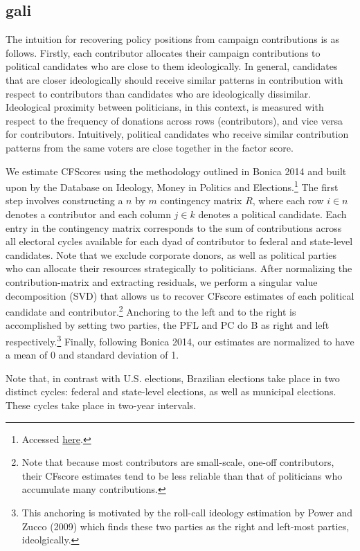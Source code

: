 \documentclass[12pt,english]{article}
\numberwithin{equation}{section}
\theoremstyle{plain}
\theoremstyle{remark}
\theoremstyle{plain}
\begin{document}
 
\subsection{gali}
The intuition for recovering policy positions from campaign contributions is as follows. Firstly, each contributor allocates their campaign contributions to political candidates who are close to them ideologically. In general, candidates that are closer ideologically should receive similar patterns in contribution with respect to contributors than candidates who are ideologically dissimilar. Ideological proximity between politicians, in this context, is measured with respect to the frequency of donations across rows (contributors), and vice versa for contributors. Intuitively, political candidates who receive similar contribution patterns from the same voters are close together in the factor score.

We estimate CFScores using the methodology outlined in Bonica 2014 and built upon by the Database on Ideology, Money in Politics and Elections.\footnote{Accessed \href{https://web.stanford.edu/~bonica/data.html}{here}.} The first step involves constructing a $n$ by $m$ contingency matrix $R$, where each row $i \in n$ denotes a contributor and each column $j \in k$ denotes a political candidate. Each entry in the contingency matrix corresponds to the sum of contributions across all electoral cycles available for each dyad of contributor to federal and state-level candidates. Note that we exclude corporate donors, as well as political parties who can allocate their resources strategically to politicians. After normalizing the contribution-matrix and extracting residuals, we perform a singular value decomposition (SVD) that allows us to recover CFscore estimates of each political candidate and contributor.\footnote{Note that because most contributors are small-scale, one-off contributors, their CFscore estimates tend to be less reliable than that of politicians who accumulate many contributions.} Anchoring to the left and to the right is accomplished by setting two parties, the PFL and PC do B as right and left respectively.\footnote{This anchoring is motivated by the roll-call ideology estimation by Power and Zucco (2009) which finds these two parties as the right and left-most parties, ideolgically.} Finally, following Bonica 2014, our estimates are normalized to have a mean of 0 and standard deviation of 1.

Note that, in contrast with U.S. elections, Brazilian elections take place in two distinct cycles: federal and state-level elections, as well as municipal elections. These cycles take place in two-year intervals. 
\end{document}
